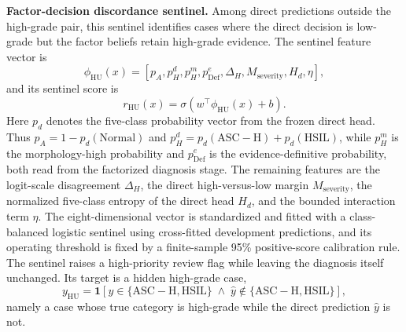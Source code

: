 \documentclass[conference]{IEEEtran}
\begin{document}
\textbf{Factor-decision discordance sentinel.} Among direct
predictions outside the high-grade pair, this sentinel identifies
cases where the direct decision is low-grade but the factor beliefs
retain high-grade evidence. The sentinel feature vector is
\begin{equation}
    \phi_{\mathrm{HU}}(x)=
    [p_A,p_H^d,p_H^m,p_{\mathrm{Def}}^e,\Delta_H,M_{\mathrm{severity}},H_d,\eta],
    \label{eq:sentinel_features}
\end{equation}
and its sentinel score is
\begin{equation}
    r_{\mathrm{HU}}(x)=\sigma(w^\top\phi_{\mathrm{HU}}(x)+b).
    \label{eq:sentinel_score}
\end{equation}
Here $p_d$ denotes the five-class probability vector from the frozen
direct head. Thus $p_A=1-p_d(\mathrm{Normal})$ and
$p_H^d=p_d(\mathrm{ASC\!-\!H})+p_d(\mathrm{HSIL})$, while $p_H^m$ is
the morphology-high probability and $p_{\mathrm{Def}}^e$ is the
evidence-definitive probability, both read from the factorized
diagnosis stage. The remaining features are the logit-scale
disagreement $\Delta_H$, the direct high-versus-low margin
$M_{\mathrm{severity}}$, the normalized five-class entropy of the
direct head $H_d$, and the bounded interaction term $\eta$. The
eight-dimensional vector is standardized and fitted with a
class-balanced logistic sentinel using cross-fitted development
predictions, and its operating threshold is fixed by a finite-sample
95\% positive-score calibration rule. The sentinel raises a
high-priority review flag while leaving the diagnosis itself
unchanged. Its target is a hidden high-grade case,
\begin{equation}
 y_{\mathrm{HU}}=\mathbf{1}\!\left[y\in\{\mathrm{ASC\!-\!H},\mathrm{HSIL}\}\;\land\;\hat y\notin\{\mathrm{ASC\!-\!H},\mathrm{HSIL}\}\right],
 \label{eq:hu_target}
\end{equation}
namely a case whose true category is high-grade while the direct
prediction $\hat y$ is not.
\end{document}
